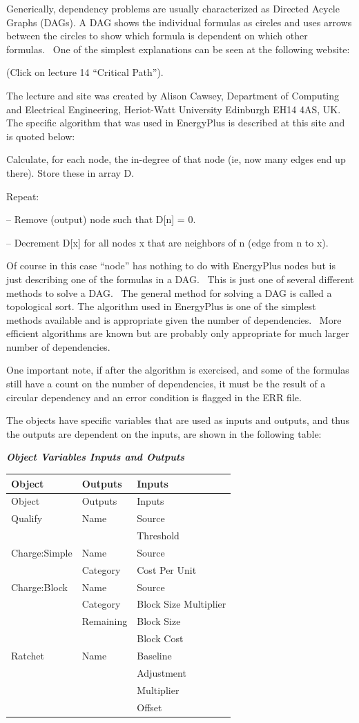 Generically, dependency problems are usually characterized as Directed Acycle Graphs (DAGs). A DAG shows the individual formulas as circles and uses arrows between the circles to show which formula is dependent on which other formulas.~ One of the simplest explanations can be seen at the following website:

(Click on lecture 14 ``Critical Path'').

The lecture and site was created by Alison Cawsey, Department of Computing and Electrical Engineering, Heriot-Watt University Edinburgh EH14 4AS, UK.~ The specific algorithm that was used in EnergyPlus is described at this site and is quoted below:

Calculate, for each node, the in-degree of that node (ie, now many edges end up there). Store these in array D.

Repeat:

-- Remove (output) node such that D{[}n{]} = 0.

-- Decrement D{[}x{]} for all nodes x that are neighbors of n (edge from n to x).

Of course in this case ``node'' has nothing to do with EnergyPlus nodes but is just describing one of the formulas in a DAG.~ This is just one of several different methods to solve a DAG.~ The general method for solving a DAG is called a topological sort. The algorithm used in EnergyPlus is one of the simplest methods available and is appropriate given the number of dependencies.~ More efficient algorithms are known but are probably only appropriate for much larger number of dependencies.

One important note, if after the algorithm is exercised, and some of the formulas still have a count on the number of dependencies, it must be the result of a circular dependency and an error condition is flagged in the ERR file.

The objects have specific variables that are used as inputs and outputs, and thus the outputs are dependent on the inputs, are shown in the following table:

\textbf{\emph{Object Variables Inputs and Outputs}}

\begin{longtable}[c]{@{}lll@{}}
\toprule 
Object & Outputs & Inputs \tabularnewline
\midrule
\endfirsthead

\toprule 
Object & Outputs & Inputs \tabularnewline
\midrule
\endhead

Qualify & Name & Source \tabularnewline
~ & ~ & Threshold \tabularnewline
Charge:Simple & Name & Source \tabularnewline
~ & Category & Cost Per Unit \tabularnewline
Charge:Block & Name & Source \tabularnewline
~ & Category & Block Size Multiplier \tabularnewline
~ & Remaining & Block Size \tabularnewline
~ & ~ & Block Cost \tabularnewline
Ratchet & Name & Baseline \tabularnewline
~ & ~ & Adjustment \tabularnewline
~ & ~ & Multiplier \tabularnewline
~ & ~ & Offset \tabularnewline
\bottomrule
\end{longtable}

